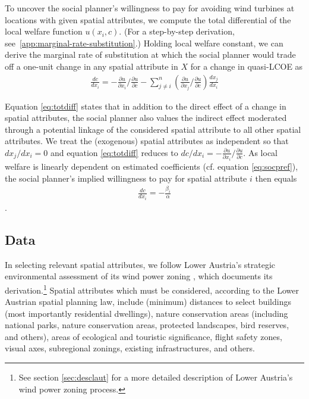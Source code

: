 \documentclass[review, a4paper, 12pt, authoryear, times]{elsarticle}
\begin{document}
To uncover the social planner's willingness to pay for avoiding wind turbines at locations with given spatial attributes, we compute the total differential of the local welfare function $u(x_i,c)$.
(For a step-by-step derivation, see~\ref{app:marginal-rate-substitution}.)
Holding local welfare constant, we can derive the marginal rate of substitution at which the social planner would trade off a one-unit change in any spatial attribute in $X$ for a change in quasi-LCOE as
\begin{align}\label{eq:totdiff}
    \frac{dc}{dx_i} = - \frac{\partial u}{\partial x_i} / \frac{\partial u}{\partial c} - \sum_{j \neq i}^{n} \left( \frac{\partial u}{\partial x_j} / \frac{\partial u}{\partial c} \right) \frac{dx_j}{dx_i}
\end{align}

Equation \eqref{eq:totdiff} states that in addition to the direct effect of a change in spatial attributes, the social planner also values the indirect effect moderated through a potential linkage of the considered spatial attribute to all other spatial attributes.
We treat the (exogenous) spatial attributes as independent so that $dx_j / dx_i = 0$ and equation \eqref{eq:totdiff} reduces to $dc / dx_i = - \frac{\partial u}{\partial x_i} / \frac{\partial u}{\partial c}$.
As local welfare is linearly dependent on estimated coefficients (cf. equation \eqref{eq:socpref}), the social planner's implied willingness to pay for spatial attribute $i$ then equals
\begin{align}\label{eq:mrs}
    \frac{d c}{dx_i} = - \frac{\beta_i}{\alpha}
\end{align}
\citep[see also][]{Train2009, Louviere2010}.

\subsection{Data} \label{subsec:data}
In selecting relevant spatial attributes, we follow Lower Austria's strategic environmental assessment of its wind power zoning \citep{Knoll2014}, which documents its derivation.\footnote{See section \ref{sec:desclaut} for a more detailed description of Lower Austria's wind power zoning process.}
Spatial attributes which must be considered, according to the Lower Austrian spatial planning law, include (minimum) distances to select buildings (most importantly residential dwellings), nature conservation areas (including national parks, nature conservation areas, protected landscapes, bird reserves, and others), areas of ecological and touristic significance, flight safety zones, visual axes, subregional zonings, existing infrastructures, and others. 
\end{document}
